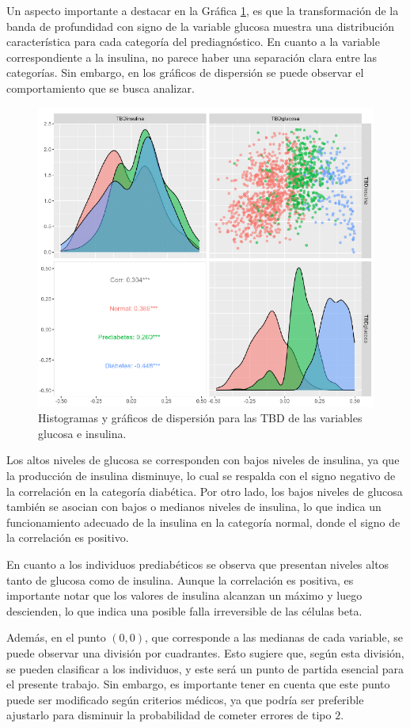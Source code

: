 Un aspecto importante a destacar en la Gráfica \ref{fig:pairsTBD}, es que la transformación de la banda de profundidad con signo de la variable glucosa muestra una distribución característica para cada categoría del prediagnóstico. En cuanto a la variable correspondiente a la insulina, no parece haber una separación clara entre las categorías. Sin embargo, en los gráficos de dispersión se puede observar el comportamiento que se busca analizar.

\begin{figure}[H]
    \centering
    \includegraphics[width = 0.7 \textwidth]{Imagenes/pairsTBDS.png}
    \caption{Histogramas y gráficos de dispersión para las TBD de las variables glucosa e insulina.}
    \label{fig:pairsTBD}
\end{figure}


Los altos niveles de glucosa se corresponden con bajos niveles de insulina, ya que la producción de insulina disminuye, lo cual se respalda con el signo negativo de la correlación en la categoría diabética. Por otro lado, los bajos niveles de glucosa también se asocian con bajos o medianos niveles de insulina, lo que indica un funcionamiento adecuado de la insulina en la categoría normal, donde el signo de la correlación es positivo.

En cuanto a los individuos prediabéticos se observa que presentan niveles altos tanto de glucosa como de insulina. Aunque la correlación es positiva, es importante notar que los valores de insulina alcanzan un máximo y luego descienden, lo que indica una posible falla irreversible de las células beta.

Además, en el punto $(0, 0)$, que corresponde a las medianas de cada variable, se puede observar una división por cuadrantes. Esto sugiere que, según esta división, se pueden clasificar a los individuos, y este será un punto de partida esencial para el presente trabajo. Sin embargo, es importante tener en cuenta que este punto puede ser modificado según criterios médicos, ya que podría ser preferible ajustarlo para disminuir la probabilidad de cometer errores de tipo $2$.

